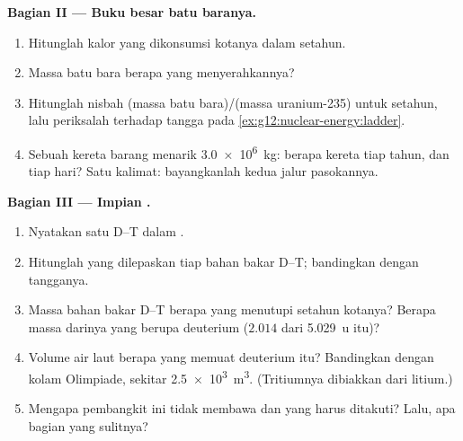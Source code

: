 \begin{problem}
\medskip
\noindent\textbf{Bagian II --- Buku besar batu baranya.}
\begin{enumerate}[resume]
  \item Hitunglah  kalor yang dikonsumsi kotanya dalam setahun.
  \item Massa batu bara berapa yang menyerahkannya?
  \item Hitunglah nisbah (massa batu bara)/(massa uranium-235) untuk setahun, lalu
        periksalah terhadap tangga pada \cref{ex:g12:nuclear-energy:ladder}.
  \item Sebuah kereta barang menarik \qty{3.0e6}{kg}: berapa kereta tiap tahun, dan
        tiap hari? Satu kalimat: bayangkanlah kedua jalur pasokannya.
\end{enumerate}

\medskip
\noindent\textbf{Bagian III --- Impian .}
\begin{enumerate}[resume]
  \item Nyatakan  satu  D--T dalam .
  \item Hitunglah  yang dilepaskan tiap  bahan bakar D--T; bandingkan dengan
        tangganya.
  \item Massa bahan bakar D--T berapa yang menutupi setahun kotanya? Berapa massa darinya yang berupa
        deuterium ($2.014$ dari \qty{5.029}{u} itu)?
  \item Volume air laut berapa yang memuat deuterium itu? Bandingkan dengan
        kolam Olimpiade, sekitar \qty{2.5e3}{m^3}. (Tritiumnya dibiakkan dari litium.)
  \item Mengapa pembangkit ini tidak membawa  dan  yang
        harus ditakuti? Lalu, apa bagian yang sulitnya?
\end{enumerate}


\end{problem}
